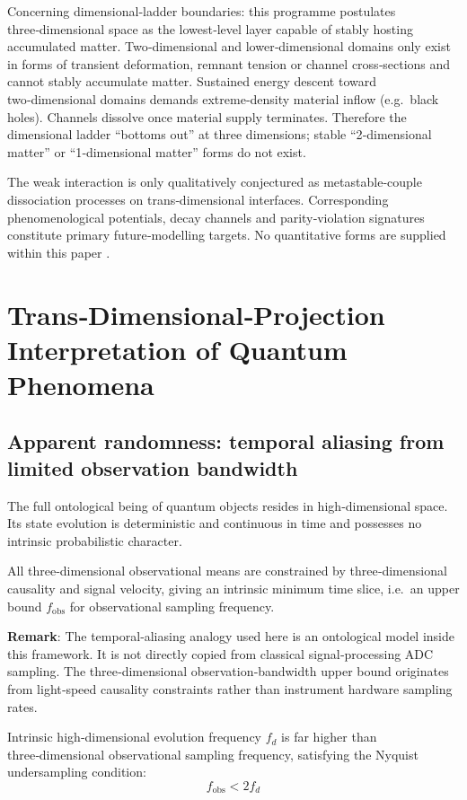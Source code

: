 \documentclass[12pt,a4paper]{article}
\begin{document}
Concerning dimensional‑ladder boundaries: this programme postulates three‑dimensional space as the lowest‑level layer capable of stably hosting accumulated matter. Two‑dimensional and lower‑dimensional domains only exist in forms of transient deformation, remnant tension or channel cross‑sections and cannot stably accumulate matter. Sustained energy descent toward two‑dimensional domains demands extreme‑density material inflow (e.g.~black holes). Channels dissolve once material supply terminates. Therefore the dimensional ladder ``bottoms out'' at three dimensions; stable ``2‑dimensional matter'' or ``1‑dimensional matter'' forms do not exist.

The weak interaction is only qualitatively conjectured as metastable‑couple dissociation processes on trans‑dimensional interfaces. Corresponding phenomenological potentials, decay channels and parity‑violation signatures constitute primary future‑modelling targets. No quantitative forms are supplied within this paper \cite{weinberg1967,wilczek2004}.

\section{Trans‑Dimensional‑Projection Interpretation of Quantum Phenomena}
\subsection{Apparent randomness: temporal aliasing from limited observation bandwidth}
The full ontological being of quantum objects resides in high‑dimensional space. Its state evolution is deterministic and continuous in time and possesses no intrinsic probabilistic character.

All three‑dimensional observational means are constrained by three‑dimensional causality and signal velocity, giving an intrinsic minimum time slice, i.e.~an upper bound $f_{\text{obs}}$ for observational sampling frequency.

\textbf{Remark}: The temporal‑aliasing analogy used here is an ontological model inside this framework. It is not directly copied from classical signal‑processing ADC sampling. The three‑dimensional observation‑bandwidth upper bound originates from light‑speed causality constraints rather than instrument hardware sampling rates.

Intrinsic high‑dimensional evolution frequency $f_d$ is far higher than three‑dimensional observational sampling frequency, satisfying the Nyquist undersampling condition:
\begin{equation}
f_{\text{obs}} < 2 f_d
\end{equation}
\end{document}
